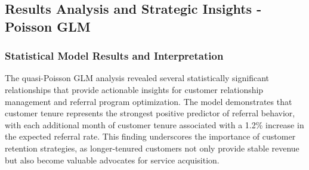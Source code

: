 \documentclass[
]{article}
\begin{document}
\hypertarget{results-analysis-and-strategic-insights---poisson-glm}{%
\subsection{Results Analysis and Strategic Insights - Poisson
GLM}\label{results-analysis-and-strategic-insights---poisson-glm}}

\hypertarget{statistical-model-results-and-interpretation}{%
\subsubsection{Statistical Model Results and
Interpretation}\label{statistical-model-results-and-interpretation}}

The quasi-Poisson GLM analysis revealed several statistically
significant relationships that provide actionable insights for customer
relationship management and referral program optimization. The model
demonstrates that customer tenure represents the strongest positive
predictor of referral behavior, with each additional month of customer
tenure associated with a 1.2\% increase in the expected referral rate.
This finding underscores the importance of customer retention
strategies, as longer-tenured customers not only provide stable revenue
but also become valuable advocates for service acquisition.
\end{document}
